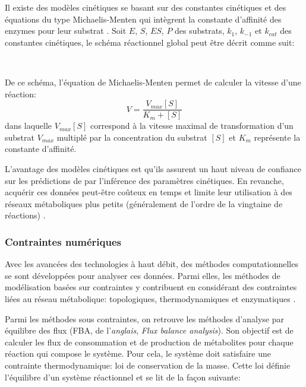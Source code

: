 \documentclass[../main.tex]{subfiles}
\begin{document}
Il existe des modèles cinétiques se basant sur des constantes cinétiques et des équations du type Michaelis-Menten qui intègrent la constante d'affinité des enzymes pour leur substrat \citep{costaKineticModelingCell2016}. Soit $E$, $S$, $ES$, $P$ des substrats, $k_1$, $k_{-1}$ et $k_{cat}$ des constantes cinétiques, le schéma réactionnel global peut être décrit comme suit:

\begin{center}
\\
\end{center}

De ce schéma, l'équation de Michaelis-Menten permet de calculer la vitesse d'une réaction:
\begin{equation}
    V = \frac{V_{max}[S]}{K_m + [S]} \label{1}
\end{equation}
dans laquelle $V_{max}[S]$ correspond à la vitesse maximal de transformation d'un substrat $V_{max}$ multiplé par la concentration du substrat $[S]$ et  $K_m$ représente la constante d'affinité. 

L'avantage des modèles cinétiques est qu'ils assurent un haut niveau de confiance sur les prédictions de par l'inférence des paramètres cinétiques. En revanche, acquérir ces données peut-être coûteux en temps et limite leur utilisation à des réseaux métaboliques plus petits (généralement de l'ordre de la vingtaine de réactions) \citep{vanrosmalenModelReductionGenomescale2021}.


\subsubsection{Contraintes numériques}
Avec les avancées des technologies à haut débit, des méthodes computationnelles se sont développées pour analyser ces données. Parmi elles, les méthodes de modélisation basées sur contraintes y contribuent en considérant des contraintes liées au réseau métabolique: topologiques, thermodynamiques et enzymatiques \citep{Rajvanshi2013}.
%

Parmi les méthodes sous contraintes, on retrouve les méthodes d'analyse par équilibre des flux (FBA, de l'\textit{anglais}, \textit{Flux balance analysis})\citep{Orth2010}. Son objectif est de calculer les flux de consommation et de production de métabolites pour chaque réaction qui compose le système. Pour cela, le système doit satisfaire une contrainte thermodynamique: loi de conservation de la masse. Cette loi définie l'équilibre d'un système réactionnel et se lit de la façon suivante:
\end{document}
